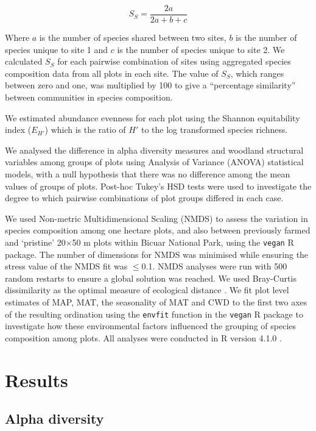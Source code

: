 \begin{refsection}
\begin{equation}
	\label{bicuar:sorensen}
	S_S = \frac{2a}{2a + b + c}
\end{equation}

Where $a$ is the number of species shared between two sites, $b$ is the number of species unique to site 1 and $c$ is the number of species unique to site 2. We calculated $S_{S}$ for each pairwise combination of sites using aggregated species composition data from all plots in each site. The value of $S_{S}$, which ranges between zero and one, was multiplied by 100 to give a ``percentage similarity'' between communities in species composition.

We estimated abundance evenness for each plot using the Shannon equitability index ($E_{H'}$) \citep{Smith1996} which is the ratio of $H'$ to the log transformed species richness.

We analysed the difference in alpha diversity measures and woodland structural variables among groups of plots using Analysis of Variance (ANOVA) statistical models, with a null hypothesis that there was no difference among the mean values of groups of plots. Post-hoc Tukey's HSD tests were used to investigate the degree to which pairwise combinations of plot groups differed in each case.

We used Non-metric Multidimensional Scaling (NMDS) to assess the variation in species composition among one hectare plots, and also between previously farmed and `pristine' 20$\times$50 m plots within Bicuar National Park, using the \texttt{vegan} R package. The number of dimensions for NMDS was minimised while ensuring the stress value of the NMDS fit was $\le$0.1. NMDS analyses were run with 500 random restarts to ensure a global solution was reached. We used Bray-Curtis dissimilarity as the optimal measure of ecological distance \citep{Legendre2013}. We fit plot level estimates of MAP, MAT, the seasonality of MAT and CWD to the first two axes of the resulting ordination using the \texttt{envfit} function in the \texttt{vegan} R package to investigate how these environmental factors influenced the grouping of species composition among plots. All analyses were conducted in R version 4.1.0 \citep{R2020}.

\section{Results}
\label{bicuar:sec:results}

\subsection{Alpha diversity}
\label{bicuar:ssec:alpha}


\end{refsection}
